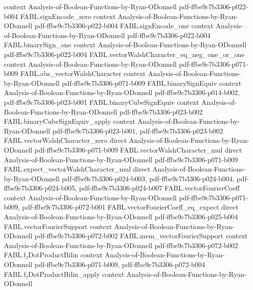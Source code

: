 \begin{theorem}
  {context}
  {Analysis-of-Boolean-Functions-by-Ryan-ODonnell}
  {pdf-ffbe9c7b3306-p022-b004}
\proofstep
  {FABL.signEncode_zero}
  {context}
  {Analysis-of-Boolean-Functions-by-Ryan-ODonnell}
  {pdf-ffbe9c7b3306-p022-b004}
\proofstep
  {FABL.signEncode_one}
  {context}
  {Analysis-of-Boolean-Functions-by-Ryan-ODonnell}
  {pdf-ffbe9c7b3306-p022-b004}
\proofstep
  {FABL.binarySign_one}
  {context}
  {Analysis-of-Boolean-Functions-by-Ryan-ODonnell}
  {pdf-ffbe9c7b3306-p022-b004}
\proofstep
  {FABL.vectorWalshCharacter_eq_neg_one_or_one}
  {context}
  {Analysis-of-Boolean-Functions-by-Ryan-ODonnell}
  {pdf-ffbe9c7b3306-p071-b009}
\proofstep
  {FABL.abs_vectorWalshCharacter}
  {context}
  {Analysis-of-Boolean-Functions-by-Ryan-ODonnell}
  {pdf-ffbe9c7b3306-p071-b009}
\proofstep
  {FABL.binarySignEquiv}
  {context}
  {Analysis-of-Boolean-Functions-by-Ryan-ODonnell}
  {pdf-ffbe9c7b3306-p014-b002,
    pdf-ffbe9c7b3306-p023-b001}
\proofstep
  {FABL.binaryCubeSignEquiv}
  {context}
  {Analysis-of-Boolean-Functions-by-Ryan-ODonnell}
  {pdf-ffbe9c7b3306-p023-b002}
\proofstep
  {FABL.binaryCubeSignEquiv_apply}
  {context}
  {Analysis-of-Boolean-Functions-by-Ryan-ODonnell}
  {pdf-ffbe9c7b3306-p023-b001,
    pdf-ffbe9c7b3306-p023-b002}
\proofstep
  {FABL.vectorWalshCharacter_zero}
  {direct}
  {Analysis-of-Boolean-Functions-by-Ryan-ODonnell}
  {pdf-ffbe9c7b3306-p071-b009}
\proofstep
  {FABL.vectorWalshCharacter_mul}
  {direct}
  {Analysis-of-Boolean-Functions-by-Ryan-ODonnell}
  {pdf-ffbe9c7b3306-p071-b009}
\proofstep
  {FABL.expect_vectorWalshCharacter_mul}
  {direct}
  {Analysis-of-Boolean-Functions-by-Ryan-ODonnell}
  {pdf-ffbe9c7b3306-p024-b003,
    pdf-ffbe9c7b3306-p024-b004,
    pdf-ffbe9c7b3306-p024-b005,
    pdf-ffbe9c7b3306-p024-b007}
\proofstep
  {FABL.vectorFourierCoeff}
  {context}
  {Analysis-of-Boolean-Functions-by-Ryan-ODonnell}
  {pdf-ffbe9c7b3306-p071-b009,
    pdf-ffbe9c7b3306-p072-b001}
\proofstep
  {FABL.vectorFourierCoeff_eq_expect}
  {direct}
  {Analysis-of-Boolean-Functions-by-Ryan-ODonnell}
  {pdf-ffbe9c7b3306-p025-b004}
\proofstep
  {FABL.vectorFourierSupport}
  {context}
  {Analysis-of-Boolean-Functions-by-Ryan-ODonnell}
  {pdf-ffbe9c7b3306-p072-b002}
\proofstep
  {FABL.mem_vectorFourierSupport}
  {context}
  {Analysis-of-Boolean-Functions-by-Ryan-ODonnell}
  {pdf-ffbe9c7b3306-p072-b002}
\proofstep
  {FABL.f₂DotProductBilin}
  {context}
  {Analysis-of-Boolean-Functions-by-Ryan-ODonnell}
  {pdf-ffbe9c7b3306-p071-b009,
    pdf-ffbe9c7b3306-p072-b004}
\proofstep
  {FABL.f₂DotProductBilin_apply}
  {context}
  {Analysis-of-Boolean-Functions-by-Ryan-ODonnell}

\end{theorem}
